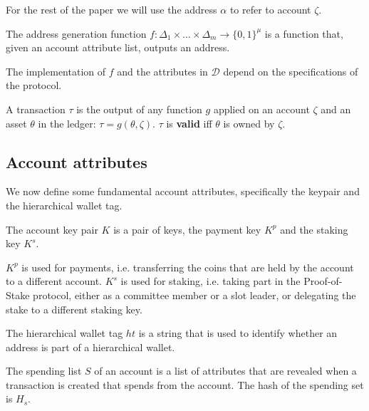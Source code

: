 For the rest of the paper we will use the address $\alpha$ to refer to account $\zeta$.

\begin{defn}\label{def:addressgen}
The address generation function $f : {\Delta}_1 \times \ldots \times {\Delta}_m \rightarrow \{0, 1\}^\mu$ is a function that, given an account attribute list, outputs an address.
\end{defn}

The implementation of $f$ and the attributes in $\mathcal{D}$ depend on the specifications of the protocol.

\begin{defn}[Transaction]\label{def:transaction}
A transaction $\tau$ is the output of any function $g$ applied on an account $\zeta$ and an asset $\theta$ in the ledger: $\tau = g(\theta, \zeta)$. $\tau$ is \textbf{valid} iff $\theta$ is owned by $\zeta$.
\end{defn}

\subsection{Account attributes}

We now define some fundamental account attributes, specifically the keypair and the hierarchical wallet tag.

\begin{defn}\label{def:keypair}
The account key pair $K$ is a pair of keys, the payment key $K^p$ and the staking key $K^s$.
\end{defn}

$K^p$ is used for payments, i.e. transferring the coins that are held by the account to a different account. $K^s$ is used for staking, i.e. taking part in the Proof-of-Stake protocol, either as a committee member or a slot leader, or delegating the stake to a different staking key.

\begin{defn}\label{def:hierarchical_tag}
The hierarchical wallet tag $ht$ is a string that is used to identify whether an address is part of a hierarchical wallet.
\end{defn}

\begin{defn}\label{def:spending_part}
The spending list $S$ of an account is a list of attributes that are revealed when a transaction is created that spends from the account. The hash of the spending set is $H_s$.
\end{defn}

